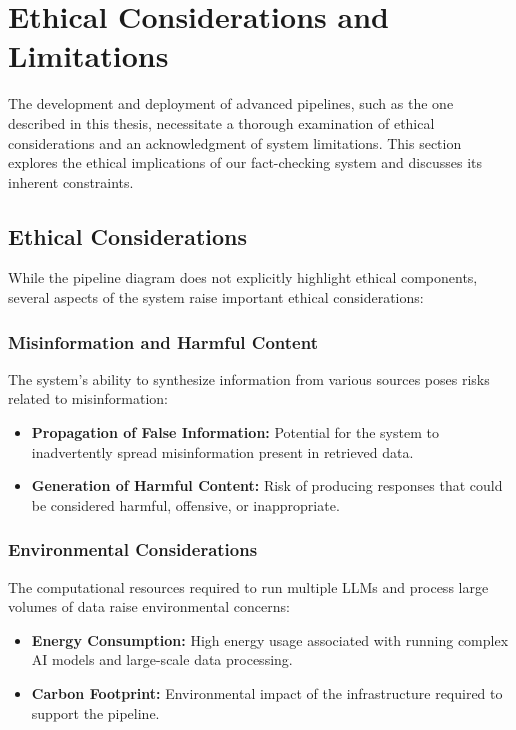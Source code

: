 \section{Ethical Considerations and Limitations}\label{sec:ethical-considerations-and-limitations}
The development and deployment of advanced pipelines, such as the one described in this thesis, necessitate a thorough examination of ethical considerations and an acknowledgment of system limitations.
This section explores the ethical implications of our fact-checking system and discusses its inherent constraints.

\subsection{Ethical Considerations}\label{subsec:ethical-considerations}
While the pipeline diagram does not explicitly highlight ethical components, several aspects of the system raise important ethical considerations:

\subsubsection{Misinformation and Harmful Content}\label{subsubsec:misinformation-and-harmful-content}
The system's ability to synthesize information from various sources poses risks related to misinformation:
\begin{itemize}
    \item \textbf{Propagation of False Information:} Potential for the system to inadvertently spread misinformation present in retrieved data.
    \item \textbf{Generation of Harmful Content:} Risk of producing responses that could be considered harmful, offensive, or inappropriate.
\end{itemize}


\subsubsection{Environmental Considerations}\label{subsubsec:environmental-considerations}
The computational resources required to run multiple LLMs and process large volumes of data raise environmental concerns:
\begin{itemize}
    \item \textbf{Energy Consumption:} High energy usage associated with running complex AI models and large-scale data processing.
    \item \textbf{Carbon Footprint:} Environmental impact of the infrastructure required to support the pipeline.
\end{itemize}

